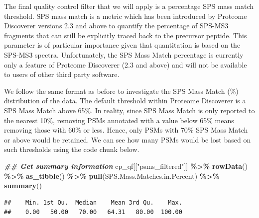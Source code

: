 \documentclass[9pt,a4paper,]{extarticle}
\newenvironment{Shaded}{\begin{snugshade}}{\end{snugshade}}
\newcommand{\DocumentationTok}[1]{\textcolor[rgb]{0.56,0.35,0.01}{\textbf{\textit{#1}}}}
\newcommand{\FunctionTok}[1]{\textcolor[rgb]{0.13,0.29,0.53}{\textbf{#1}}}
\newcommand{\NormalTok}[1]{#1}
\newcommand{\SpecialCharTok}[1]{\textcolor[rgb]{0.81,0.36,0.00}{\textbf{#1}}}
\newcommand{\StringTok}[1]{\textcolor[rgb]{0.31,0.60,0.02}{#1}}
\begin{document}
The final quality control filter that we will apply is a percentage SPS mass
match threshold. SPS mass match is a metric which has been introduced by
Proteome Discoverer versions 2.3 and above to quantify the percentage of SPS-MS3
fragments that can still be explicitly traced back to the precursor peptide.
This parameter is of particular importance given that quantitation is based on
the SPS-MS3 spectra. Unfortunately, the SPS Mass Match percentage is currently
only a feature of Proteome Discoverer (2.3 and above) and will not be available
to users of other third party software.

We follow the same format as before to investigate the SPS Mass Match (\%)
distribution of the data. The default threshold within Proteome Discoverer is a
SPS Mass Match above 65\%. In reality, since SPS Mass Match is only reported to
the nearest 10\%, removing PSMs annotated with a value below 65\% means removing
those with 60\% or less. Hence, only PSMs with 70\% SPS Mass Match or above would
be retained. We can see how many PSMs would be lost based on such thresholds
using the code chunk below.

\begin{Shaded}
\begin{Highlighting}[]
\DocumentationTok{\#\# Get summary information}
\NormalTok{cp\_qf[[}\StringTok{"psms\_filtered"}\NormalTok{]] }\SpecialCharTok{\%\textgreater{}\%} 
  \FunctionTok{rowData}\NormalTok{() }\SpecialCharTok{\%\textgreater{}\%} 
  \FunctionTok{as\_tibble}\NormalTok{() }\SpecialCharTok{\%\textgreater{}\%} 
  \FunctionTok{pull}\NormalTok{(SPS.Mass.Matches.in.Percent) }\SpecialCharTok{\%\textgreater{}\%} 
  \FunctionTok{summary}\NormalTok{()}
\end{Highlighting}
\end{Shaded}

\begin{verbatim}
##    Min. 1st Qu.  Median    Mean 3rd Qu.    Max. 
##    0.00   50.00   70.00   64.31   80.00  100.00
\end{verbatim}
\end{document}
